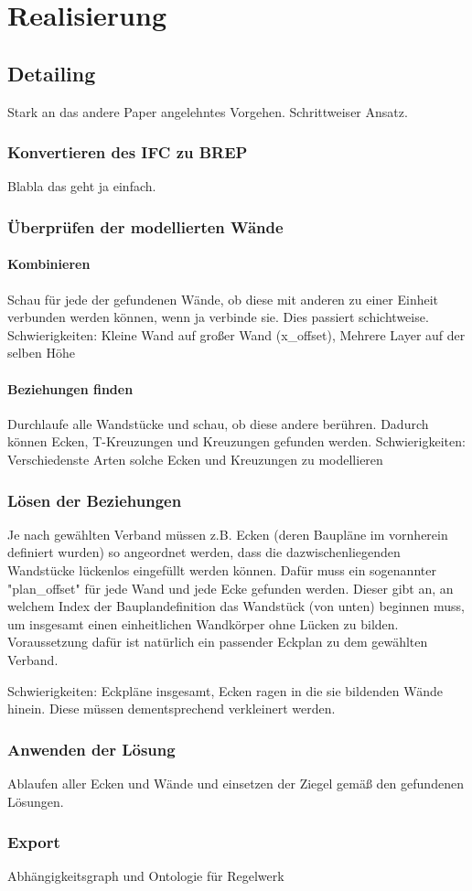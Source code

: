 \chapter{Realisierung}
\section{Detailing}
Stark an das andere Paper angelehntes Vorgehen.
Schrittweiser Ansatz.

\subsection{Konvertieren des IFC zu BREP}
Blabla das geht ja einfach.

\subsection{Überprüfen der modellierten Wände}
\subsubsection{Kombinieren}
Schau für jede der gefundenen Wände, ob diese mit anderen zu einer Einheit verbunden werden können, wenn ja verbinde sie.
Dies passiert schichtweise.
Schwierigkeiten: Kleine Wand auf großer Wand (x\_offset), Mehrere Layer auf der selben Höhe
\subsubsection{Beziehungen finden}
Durchlaufe alle Wandstücke und schau, ob diese andere berühren.
Dadurch können Ecken, T-Kreuzungen und Kreuzungen gefunden werden.
Schwierigkeiten: Verschiedenste Arten solche Ecken und Kreuzungen zu modellieren 

\subsection{Lösen der Beziehungen}
Je nach gewählten Verband müssen z.B. Ecken (deren Baupläne im vornherein definiert wurden) so angeordnet werden, dass die dazwischenliegenden Wandstücke lückenlos eingefüllt werden können.
Dafür muss ein sogenannter "plan\_offset" für jede Wand und jede Ecke gefunden werden. Dieser gibt an, an welchem Index der Bauplandefinition das Wandstück (von unten) beginnen muss, um insgesamt einen einheitlichen Wandkörper ohne Lücken zu bilden.
Voraussetzung dafür ist natürlich ein passender Eckplan zu dem gewählten Verband. 

Schwierigkeiten: Eckpläne insgesamt, Ecken ragen in die sie bildenden Wände hinein. Diese müssen dementsprechend verkleinert werden.

\subsection{Anwenden der Lösung}
Ablaufen aller Ecken und Wände und einsetzen der Ziegel gemäß den gefundenen Lösungen.

\subsection{Export}
Abhängigkeitsgraph und Ontologie für Regelwerk